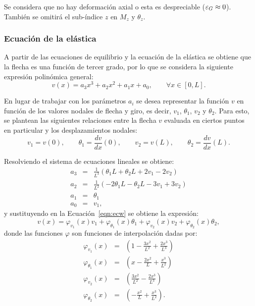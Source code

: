 Se considera que no hay deformación axial o esta es despreciable ($\varepsilon_{G}\approx 0$). %
%
También se omitirá el sub-índice $z$ en $M_z$ y $\theta_z$. 

\subsubsection{Ecuación de la elástica}

A partir de las ecuaciones de equilibrio y la ecuación de la elástica se obtiene que la flecha es una función de tercer grado, por lo que se considera la siguiente expresión polinómica general:
%
\begin{equation}\label{eqn:ecw}
v(x) = a_3 x^3 + a_2 x^2 + a_1 x + a_0, \qquad \forall x \in [0,L].
\end{equation}

En lugar de trabajar con los parámetros $a_i$ se desea representar la función $v$ en función de los valores nodales de flecha y giro, es decir, $v_1$,  $\theta_1$, $v_2$ y $\theta_2$. %
%
Para esto, se plantean las siguientes relaciones entre la flecha $v$ evaluada en ciertos puntos en particular y los desplazamientos nodales:
%
\begin{equation}
v_1 = v(0), \qquad
\theta_1 = \frac{d v}{d x} (0), \qquad
v_2 = v(L), \qquad
\theta_2 = \frac{d v}{d x}(L).
\end{equation}

Resolviendo el sistema de ecuaciones lineales se obtiene:
%
\begin{eqnarray}
a_3 &=& \frac{1}{L^3} \left( \theta_{1} L + \theta_{2} L + 2 v_{1} - 2 v_{2} \right) \nonumber\\
a_2 &=&	\frac{1}{L^2} \left( - 2 \theta_{1} L - \theta_{2}  L - 	3 v_{1} + 3 v_{2}  \right) \nonumber\\
a_1 &=&	\theta_{1} \nonumber\\
a_0 &=&	v_{1}, \nonumber
\end{eqnarray}
%
y sustituyendo en la Ecuación~\eqref{eqn:ecw} se obtiene la expresión:
%
\begin{equation} \label{eqn:elastica}
v(x) =  \varphi_{v_1}(x) v_1 + \varphi_{\theta_1}(x) \theta_1
+ \varphi_{v_2}(x) v_2 + \varphi_{\theta_2}(x) \theta_2,
\end{equation}
%
donde las funciones $\varphi$ son funciones de interpolación dadas por:
%
\begin{eqnarray}
\varphi_{v_1} (x) &=& \left(1 - \frac{3 x^{2}}{L^{2}} + \frac{2 x^{3}}{L^{3}}\right) \\
\varphi_{\theta_1} (x) &=&	\left(x - \frac{2 x^{2}}{L} + \frac{x^{3}}{L^{2}}\right) \\
\varphi_{v_2} (x) &=&	\left(\frac{3 x^{2}}{L^{2}} - \frac{2 x^{3}}{L^{3}}\right) \\
\varphi_{\theta_2} (x) &=& \left(- \frac{x^{2}}{L} + \frac{x^{3}}{L^{2}}\right) .
\end{eqnarray}

